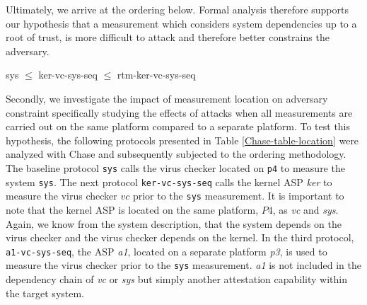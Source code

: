 \documentclass[runningheads]{llncs}
\theoremstyle{definition}
\begin{document}
Ultimately, we arrive at the ordering below. Formal analysis therefore supports our hypothesis that a measurement which considers system dependencies up to a root of trust, is more difficult to attack and therefore better constrains the adversary. 
\begin{center}
    sys $\leq$ ker-vc-sys-seq $\leq$ rtm-ker-vc-sys-seq
\end{center}

Secondly, we investigate the impact of measurement location on adversary constraint specifically studying the effects of attacks when all measurements are carried out on the same platform compared to a separate platform. To test this hypothesis, the following protocols presented in Table \ref{Chase-table-location} were analyzed with Chase and subsequently subjected to the ordering methodology. The baseline protocol \texttt{sys} calls the virus checker located on \texttt{p4} to measure the system \texttt{sys}. The next protocol \texttt{ker-vc-sys-seq} calls the kernel ASP \emph{ker} to measure the virus checker $vc$ prior to the \texttt{sys} measurement. It is important to note that the kernel ASP is located on the same platform, $P4$, as \emph{vc} and \emph{sys}. Again, we know from the system description, that the system depends on the virus checker and the virus checker depends on the kernel. In the third protocol, \texttt{a1-vc-sys-seq}, the ASP \emph{a1}, located on a separate platform \emph{p3}, is used to measure the virus checker prior to the \texttt{sys} measurement. \emph{a1} is not included in the dependency chain of \emph{vc} or \emph{sys} but simply another attestation capability within the target system.

\end{document}
